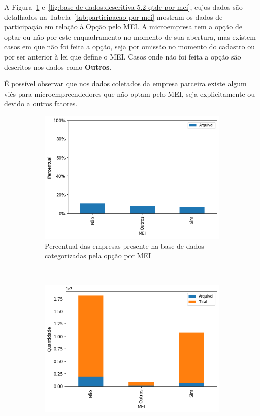 A Figura~\ref{fig:base-de-dados:descritiva-5.1-presenca-por-mei} e~\ref{fig:base-de-dados:descritiva-5.2-qtde-por-mei}, cujos dados são detalhados na Tabela~\ref{tab:participacao-por-mei} mostram os dados de participação em relação à Opção pelo MEI. A microempresa tem a opção de optar ou não por este enquadramento no momento de sua abertura, mas existem casos em que não foi feita a opção, seja por omissão no momento do cadastro ou por ser anterior à lei que define o MEI. Casos onde não foi feita a opção são descritos nos dados como \textbf{Outros}.

É possível observar que nos dados coletados da empresa parceira existe algum viés para microempreendedores que não optam pelo MEI, seja explicitamente ou devido a outros fatores.

\begin{figure}[htb]
    \centering
    \caption{Participação por opção pelo MEI das empresas presentes na base de dados}
    \label{fig:base-de-dados:descritiva-5-qtde-por-mei}
    \begin{subfigure}[b]{0.45\textwidth} 
        \includegraphics[scale=0.45]{images/base-de-dados-5.1-presenca-por-mei.png}
        \caption{Percentual das empresas presente na base de dados categorizadas pela opção por MEI}
        \label{fig:base-de-dados:descritiva-5.1-presenca-por-mei}
    \end{subfigure} ~ \quad
    \begin{subfigure}[b]{0.45\textwidth}
        \includegraphics[scale=0.45]{images/base-de-dados-5.2-qtde-por-mei.png}

\end{subfigure}
\end{figure}

